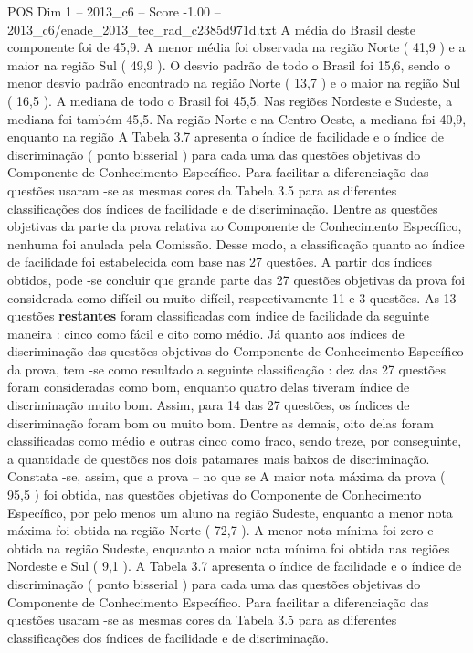 \begin{textsample}{POS Dim 1 – 2013\_c6 – Score -1.00 – 2013\_c6/enade\_2013\_tec\_rad\_c2385d971d.txt}
A média do Brasil deste componente foi de 45,9.
A menor média foi observada na região Norte ( 41,9 ) e a maior na região Sul ( 49,9 ).
O desvio padrão de todo o Brasil foi 15,6, sendo o menor desvio padrão encontrado na região Norte ( 13,7 ) e o maior na região Sul ( 16,5 ).
A mediana de todo o Brasil foi 45,5.
Nas regiões Nordeste e Sudeste, a mediana foi também 45,5.
Na região Norte e na Centro-Oeste, a mediana foi 40,9, enquanto na região A Tabela 3.7 apresenta o índice de facilidade e o índice de discriminação ( ponto bisserial ) para cada uma das questões objetivas do Componente de Conhecimento Específico.
Para facilitar a diferenciação das questões usaram -se as mesmas cores da Tabela 3.5 para as diferentes classificações dos índices de facilidade e de discriminação.
Dentre as questões objetivas da parte da prova relativa ao Componente de Conhecimento Específico, nenhuma foi anulada pela Comissão.
Desse modo, a classificação quanto ao índice de facilidade foi estabelecida com base nas 27 questões.
A partir dos índices obtidos, pode -se concluir que grande parte das 27 questões objetivas da prova foi considerada como difícil ou muito difícil, respectivamente 11 e 3 questões.
As 13 questões \textbf{restantes} foram classificadas com índice de facilidade da seguinte maneira : cinco como fácil e oito como médio.
Já quanto aos índices de discriminação das questões objetivas do Componente de Conhecimento Específico da prova, tem -se como resultado a seguinte classificação : dez das 27 questões foram consideradas como bom, enquanto quatro delas tiveram índice de discriminação muito bom.
Assim, para 14 das 27 questões, os índices de discriminação foram bom ou muito bom.
Dentre as demais, oito delas foram classificadas como médio e outras cinco como fraco, sendo treze, por conseguinte, a quantidade de questões nos dois patamares mais baixos de discriminação.
Constata -se, assim, que a prova – no que se A maior nota máxima da prova ( 95,5 ) foi obtida, nas questões objetivas do Componente de Conhecimento Específico, por pelo menos um aluno na região Sudeste, enquanto a menor nota máxima foi obtida na região Norte ( 72,7 ).
A menor nota mínima foi zero e obtida na região Sudeste, enquanto a maior nota mínima foi obtida nas regiões Nordeste e Sul ( 9,1 ).
A Tabela 3.7 apresenta o índice de facilidade e o índice de discriminação ( ponto bisserial ) para cada uma das questões objetivas do Componente de Conhecimento Específico.
Para facilitar a diferenciação das questões usaram -se as mesmas cores da Tabela 3.5 para as diferentes classificações dos índices de facilidade e de discriminação.

\end{textsample}
